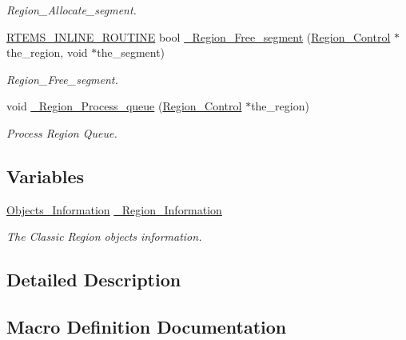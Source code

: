 \begin{DoxyCompactItemize}
\begin{DoxyCompactList}\small\item\em Region\+\_\+\+Allocate\+\_\+segment. \end{DoxyCompactList}\item 
\mbox{\hyperlink{group__RTEMSScoreBaseDefs_gac216239df231d5dbd15e3520b0b9313f}{R\+T\+E\+M\+S\+\_\+\+I\+N\+L\+I\+N\+E\+\_\+\+R\+O\+U\+T\+I\+NE}} bool \mbox{\hyperlink{group__ClassicRegionImpl_gac72484c748cac55eb42eccaa574dd6a7}{\+\_\+\+Region\+\_\+\+Free\+\_\+segment}} (\mbox{\hyperlink{structRegion__Control}{Region\+\_\+\+Control}} $\ast$the\+\_\+region, void $\ast$the\+\_\+segment)
\begin{DoxyCompactList}\small\item\em Region\+\_\+\+Free\+\_\+segment. \end{DoxyCompactList}\item 
void \mbox{\hyperlink{group__ClassicRegionImpl_ga3cf94767384ce29609efbb70c01f8531}{\+\_\+\+Region\+\_\+\+Process\+\_\+queue}} (\mbox{\hyperlink{structRegion__Control}{Region\+\_\+\+Control}} $\ast$the\+\_\+region)
\begin{DoxyCompactList}\small\item\em Process Region Queue. \end{DoxyCompactList}\end{DoxyCompactItemize}
\subsection*{Variables}
\begin{DoxyCompactItemize}
\item 
\mbox{\label{group__ClassicRegionImpl_ga80313b54b5a0ee71cf933756cf4f0c72}} 
\mbox{\hyperlink{structObjects__Information}{Objects\+\_\+\+Information}} \mbox{\hyperlink{group__ClassicRegionImpl_ga80313b54b5a0ee71cf933756cf4f0c72}{\+\_\+\+Region\+\_\+\+Information}}
\begin{DoxyCompactList}\small\item\em The Classic Region objects information. \end{DoxyCompactList}\end{DoxyCompactItemize}


\subsection{Detailed Description}


\subsection{Macro Definition Documentation}
\mbox{\label{group__ClassicRegionImpl_ga5fa5a3a4f9186420c3e6145b28f92d13}} 
